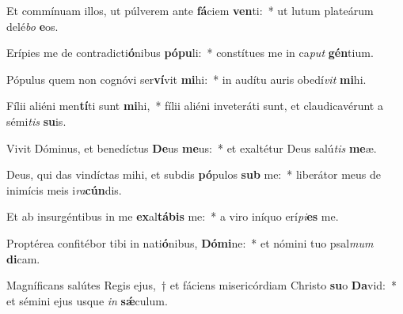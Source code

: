 \item Et commínuam illos, ut púlverem ante \textbf{fá}ciem \textbf{ven}ti:~* ut lutum plateárum delé\textit{bo} \textbf{e}os.
\item Erípies me de contradicti\textbf{ó}nibus \textbf{pó}\textbf{pu}li:~* constítues me in ca\textit{put} \textbf{gén}tium.
\item Pópulus quem non cognóvi ser\textbf{ví}vit \textbf{mi}hi:~* in audítu auris obedí\textit{vit} \textbf{mi}hi.
\item Fílii aliéni men\textbf{tí}ti sunt \textbf{mi}hi,~* fílii aliéni inveteráti sunt, et claudicavérunt a sémi\textit{tis} \textbf{su}is.
\item Vivit Dóminus, et benedíctus \textbf{De}us \textbf{me}us:~* et exaltétur Deus salú\textit{tis} \textbf{me}æ.
\item Deus, qui das vindíctas mihi, et subdis \textbf{pó}pulos \textbf{sub} me:~* liberátor meus de inimícis meis i\textit{ra}\textbf{cún}dis.
\item Et ab insurgéntibus in me \textbf{ex}al\textbf{tá}\textbf{bis} me:~* a viro iníquo erí\textit{pi}\textbf{es} me.
\item Proptérea confitébor tibi in nati\textbf{ó}nibus, \textbf{Dó}\textbf{mi}ne:~* et nómini tuo psal\textit{mum} \textbf{di}cam.
\item Magníficans salútes Regis ejus,~† et fáciens misericórdiam Christo \textbf{su}o \textbf{Da}vid:~* et sémini ejus usque \textit{in} \textbf{sǽ}culum.

